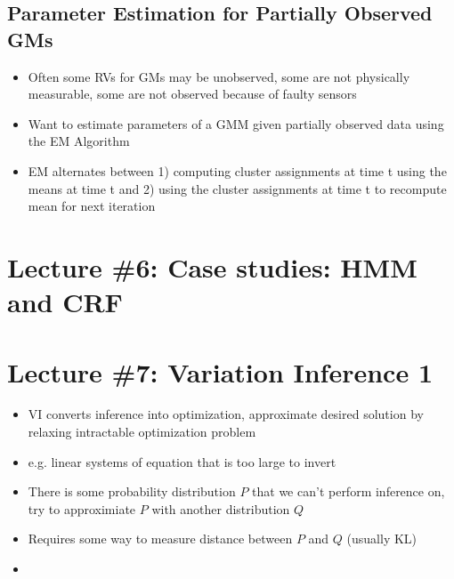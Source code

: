 \documentclass[../main.tex]{subfiles}
\begin{document}
\subsection{Parameter Estimation for Partially Observed GMs}
  \begin{itemize}
    \item Often some RVs for GMs may be unobserved, some are not physically measurable, some are not observed because of faulty sensors
    \item Want to estimate parameters of a GMM given partially observed data using the EM Algorithm
    \item EM alternates between 1) computing cluster assignments at time t using the means at time t and 2) using the cluster assignments at time t to recompute mean for next iteration
  \end{itemize}

\section{Lecture \#6: Case studies: HMM and CRF}

\section{Lecture \#7: Variation Inference 1}
\begin{itemize}
  \item VI converts inference into optimization, approximate desired solution by relaxing intractable optimization problem
  \item e.g. linear systems of equation that is too large to invert
  \item There is some probability distribution $P$ that we can't perform inference on, try to approximiate $P$ with another distribution $Q$
  \item Requires some way to measure distance between $P$ and $Q$ (usually KL)
  \item
\end{itemize}
\end{document}
